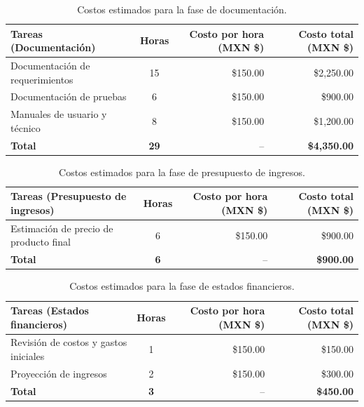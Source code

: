 \begin{table}[H]
	\centering
	\renewcommand{\arraystretch}{1.6}
	\setlength{\tabcolsep}{10pt}
	\Huge
	\begin{adjustbox}{max width=\textwidth}
		\begin{tabular}{|p{9.5cm}|c|r|r|}
			\hline
			\textbf{Tareas (Documentación)} & \textbf{Horas} & \textbf{Costo por hora (MXN \$)} & \textbf{Costo total (MXN \$)} \\ \hline
			Documentación de requerimientos & 15 & \$150.00 & \$2,250.00 \\ \hline
			Documentación de pruebas & 6 & \$150.00 & \$900.00 \\ \hline
			Manuales de usuario y técnico & 8 & \$150.00 & \$1,200.00 \\ \hline
			\textbf{Total} & \textbf{29} & -- & \textbf{\$4,350.00} \\ \hline
		\end{tabular}
	\end{adjustbox}
	\caption{Costos estimados para la fase de documentación.}
	\label{tab:costos_documentacion_nuevo}
\end{table}

\begin{table}[H]
	\centering
	\renewcommand{\arraystretch}{1.6}
	\setlength{\tabcolsep}{10pt}
	\Huge
	\begin{adjustbox}{max width=\textwidth}
		\begin{tabular}{|p{9.5cm}|c|r|r|}
			\hline
			\textbf{Tareas (Presupuesto de ingresos)} & \textbf{Horas} & \textbf{Costo por hora (MXN \$)} & \textbf{Costo total (MXN \$)} \\ \hline
			Estimación de precio de producto final & 6 & \$150.00 & \$900.00 \\ \hline
			\textbf{Total} & \textbf{6} & -- & \textbf{\$900.00} \\ \hline
		\end{tabular}
	\end{adjustbox}
	\caption{Costos estimados para la fase de presupuesto de ingresos.}
	\label{tab:costos_presupuesto_ingresos}
\end{table}

\begin{table}[H]
	\centering
	\renewcommand{\arraystretch}{1.6}
	\setlength{\tabcolsep}{10pt}
	\Huge
	\begin{adjustbox}{max width=\textwidth}
		\begin{tabular}{|p{9.5cm}|c|r|r|}
			\hline
			\textbf{Tareas (Estados financieros)} & \textbf{Horas} & \textbf{Costo por hora (MXN \$)} & \textbf{Costo total (MXN \$)} \\ \hline
			Revisión de costos y gastos iniciales & 1 & \$150.00 & \$150.00 \\ \hline
			Proyección de ingresos & 2 & \$150.00 & \$300.00 \\ \hline
			\textbf{Total} & \textbf{3} & -- & \textbf{\$450.00} \\ \hline
		\end{tabular}
	\end{adjustbox}
	\caption{Costos estimados para la fase de estados financieros.}
	\label{tab:costos_estados_financieros}
\end{table}

